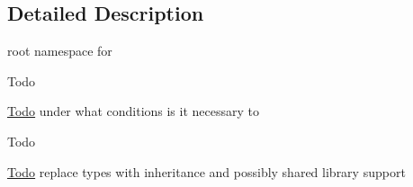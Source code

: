 \subsection{\-Detailed \-Description}
root namespace for  \begin{DoxyRefDesc}{\-Todo}
\item[\hyperlink{todo__todo000005}{\-Todo}]under what conditions is it necessary to \end{DoxyRefDesc}


\begin{DoxyRefDesc}{\-Todo}
\item[\hyperlink{todo__todo000016}{\-Todo}]replace types with inheritance and possibly shared library support \end{DoxyRefDesc}
